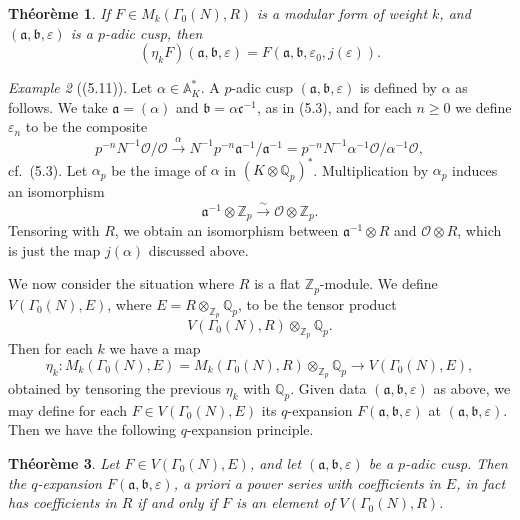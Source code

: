 \documentclass[12pt,a4paper]{article}
\theoremstyle{plain}
\newtheorem{theorem}{Th\'{e}or\`{e}me}[section]
\theoremstyle{definition}
\theoremstyle{remark}
\newtheorem{example}[theorem]{Example}
\newenvironment{namedtheorem}[1][]{%
  \renewcommand{\thetheorem}{#1}%
  \theoremstyle{plain}%
  \begin{theorem}%
}{\end{theorem}\renewcommand{\thetheorem}{\arabic{section}.\arabic{theorem}}}
\begin{document}
\begin{namedtheorem}[(5.10)]
If $F \in M_k(\Gamma_0(N), R)$ is a modular form of weight $k$, and $(\mathfrak{a}, \mathfrak{b}, \varepsilon)$ is a $p$-adic cusp, then
\[
(\eta_k F)(\mathfrak{a}, \mathfrak{b}, \varepsilon) = F(\mathfrak{a}, \mathfrak{b}, \varepsilon_0, j(\varepsilon)).
\]
\end{namedtheorem}

\begin{example}[(5.11)]
Let $\alpha \in \mathbb{A}_K^*$. A $p$-adic cusp $(\mathfrak{a}, \mathfrak{b}, \varepsilon)$ is defined by $\alpha$ as follows. We take $\mathfrak{a} = (\alpha)$ and $\mathfrak{b} = \alpha\mathfrak{c}^{-1}$, as in (5.3), and for each $n \ge 0$ we define $\varepsilon_n$ to be the composite
\[
p^{-n}N^{-1}\mathcal{O}/\mathcal{O} \xrightarrow{\alpha} N^{-1}p^{-n}\mathfrak{a}^{-1}/\mathfrak{a}^{-1} = p^{-n}N^{-1}\alpha^{-1}\mathcal{O}/\alpha^{-1}\mathcal{O},
\]
cf.~(5.3). Let $\alpha_p$ be the image of $\alpha$ in $(K \otimes \mathbb{Q}_p)^*$. Multiplication by $\alpha_p$ induces an isomorphism
\begin{equation}\label{eq:5.12}
\mathfrak{a}^{-1} \otimes \mathbb{Z}_p \xrightarrow{\sim} \mathcal{O} \otimes \mathbb{Z}_p.
\end{equation}
Tensoring with $R$, we obtain an isomorphism between $\mathfrak{a}^{-1} \otimes R$ and $\mathcal{O} \otimes R$, which is just the map $j(\alpha)$ discussed above.
\end{example}

We now consider the situation where $R$ is a flat $\mathbb{Z}_p$-module. We define $V(\Gamma_0(N), E)$, where $E = R \otimes_{\mathbb{Z}_p} \mathbb{Q}_p$, to be the tensor product
\[
V(\Gamma_0(N), R) \otimes_{\mathbb{Z}_p} \mathbb{Q}_p.
\]
Then for each $k$ we have a map
\[
\eta_k: M_k(\Gamma_0(N), E) = M_k(\Gamma_0(N), R) \otimes_{\mathbb{Z}_p} \mathbb{Q}_p \longrightarrow V(\Gamma_0(N), E),
\]
obtained by tensoring the previous $\eta_k$ with $\mathbb{Q}_p$. Given data $(\mathfrak{a}, \mathfrak{b}, \varepsilon)$ as above, we may define for each $F \in V(\Gamma_0(N), E)$ its $q$-expansion $F(\mathfrak{a}, \mathfrak{b}, \varepsilon)$ at $(\mathfrak{a}, \mathfrak{b}, \varepsilon)$. Then we have the following $q$-expansion principle.

\begin{namedtheorem}[(5.13)]
Let $F \in V(\Gamma_0(N), E)$, and let $(\mathfrak{a}, \mathfrak{b}, \varepsilon)$ be a $p$-adic cusp. Then the $q$-expansion $F(\mathfrak{a}, \mathfrak{b}, \varepsilon)$, a priori a power series with coefficients in $E$, in fact has coefficients in $R$ if and only if $F$ is an element of $V(\Gamma_0(N), R)$.
\end{namedtheorem}
\end{document}
